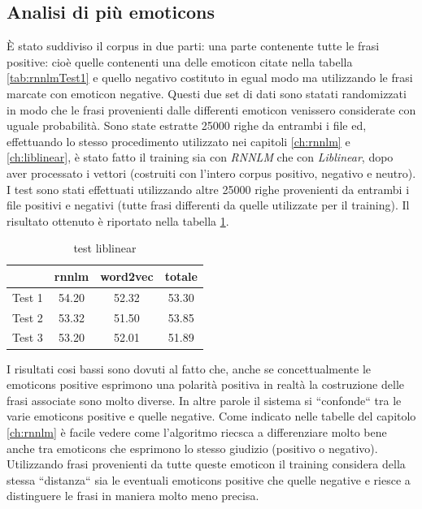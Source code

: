 \documentclass[a4paper,12pt,openright,twoside]{report}
\theoremstyle{definition}
\begin{document}
\subsection{Analisi di più emoticons}
\`E stato suddiviso il corpus in due parti: una parte contenente tutte le frasi positive: cioè quelle contenenti una delle emoticon citate nella tabella \ref{tab:rnnlmTest1} e quello negativo costituto 
in egual modo ma utilizzando le frasi marcate con emoticon negative. 
Questi due set di dati sono statati randomizzati in modo che le frasi provenienti dalle differenti emoticon venissero considerate con uguale probabilità. Sono state estratte 25000 righe da entrambi i file ed, 
effettuando lo stesso procedimento utilizzato nei capitoli \ref{ch:rnnlm} e \ref{ch:liblinear}, è stato fatto il training sia con \emph{RNNLM} che con \emph{Liblinear}, 
dopo aver processato i vettori (costruiti con l'intero corpus positivo, negativo e neutro).
I test sono stati effettuati utilizzando altre 25000 righe provenienti da entrambi i file positivi e negativi (tutte frasi differenti da quelle utilizzate per il training). Il risultato ottenuto è riportato nella tabella \ref{tab:test2}.
\begin{table}[h]
\begin{center}
\begin{tabular}{|c|c|c|c|}
\hline
& rnnlm & word2vec & totale \\
\hline
\hline
Test 1 & 54.20 & 52.32 & 53.30 \\
\hline
Test 2 & 53.32 &  51.50 &  53.85  \\
\hline
Test 3 & 53.20 & 52.01 &  51.89 \\
\hline
\end{tabular}
\end{center}
\caption{test liblinear}
\label{tab:test2}
\end{table}

I risultati cosi bassi sono dovuti al fatto che, anche se concettualmente le emoticons positive esprimono una polarità positiva in realtà la costruzione delle frasi associate sono molto diverse. 
In altre parole il sistema si ``confonde`` tra le varie emoticons positive e quelle negative. Come indicato nelle tabelle del capitolo \ref{ch:rnnlm} è facile vedere come l'algoritmo riecsca a differenziare molto 
bene anche tra emoticons che esprimono lo stesso giudizio (positivo o negativo). Utilizzando frasi provenienti da tutte queste emoticon il training considera della stessa ``distanza`` 
sia le eventuali emoticons positive che quelle negative e riesce a distinguere le frasi in maniera molto meno precisa.
\iffalse
\end{document}
